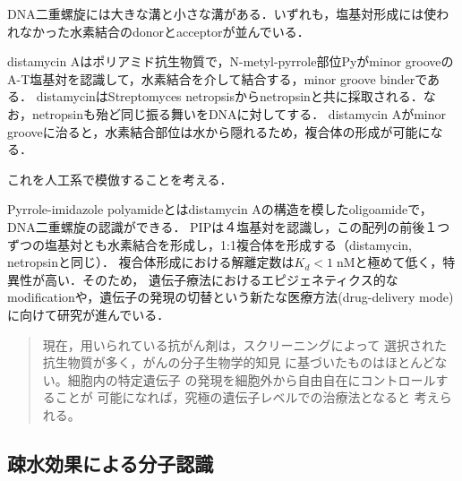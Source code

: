 \documentclass[uplatex, dvipdfmx]{jsreport}
\begin{document}
\begin{definition}
    DNA二重螺旋には大きな溝と小さな溝がある．いずれも，塩基対形成には使われなかった水素結合のdonorとacceptorが並んでいる．
\end{definition}
\begin{example}[distamycin]
    distamycin Aはポリアミド抗生物質で，N-metyl-pyrrole部位Pyがminor grooveのA-T塩基対を認識して，水素結合を介して結合する，minor groove binderである．
    distamycinはStreptomyces netropsisからnetropsinと共に採取される．なお，netropsinも殆ど同じ振る舞いをDNAに対してする．
    distamycin Aがminor grooveに治ると，水素結合部位は水から隠れるため，複合体の形成が可能になる．
\end{example}
これを人工系で模倣することを考える．

\begin{example}
    Pyrrole-imidazole polyamideとはdistamycin Aの構造を模したoligoamideで，DNA二重螺旋の認識ができる．
    PIPは４塩基対を認識し，この配列の前後１つずつの塩基対とも水素結合を形成し，1:1複合体を形成する（distamycin, netropsinと同じ）．
    複合体形成における解離定数は$K_d<1\;\mathrm{nM}$と極めて低く，特異性が高い．そのため，
    遺伝子療法におけるエピジェネティクス的なmodificationや，遺伝子の発現の切替という新たな医療方法(drug-delivery mode)に向けて研究が進んでいる．
\end{example}
\begin{application}
    \begin{quote}
        現在，用いられている抗がん剤は，スクリーニングによって
        選択された抗生物質が多く，がんの分子生物学的知見
        に基づいたものはほとんどない。細胞内の特定遺伝子
        の発現を細胞外から自由自在にコントロールすることが
        可能になれば，究極の遺伝子レベルでの治療法となると
        考えられる。
    \end{quote}
\end{application}

\subsection{疎水効果による分子認識}
\end{document}
